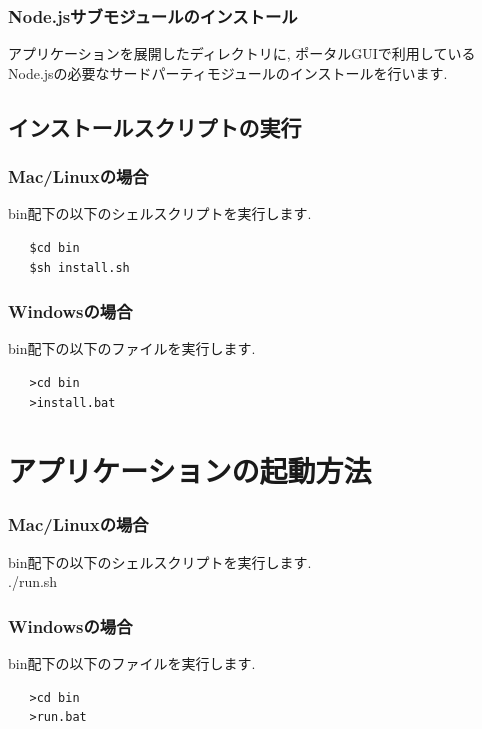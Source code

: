\documentclass[a4paper,10pt,oneside]{jsbook}
\begin{document}
\newpage


\subsection{Node.jsサブモジュールのインストール}
アプリケーションを展開したディレクトリに,
ポータルGUIで利用しているNode.jsの必要なサードパーティモジュールのインストールを行います.

\section{インストールスクリプトの実行}

\subsection{Mac/Linuxの場合}
bin配下の以下のシェルスクリプトを実行します.\\

\begin{verbatim}
   $cd bin
   $sh install.sh
\end{verbatim}


\subsection{Windowsの場合}
bin配下の以下のファイルを実行します.\\
\begin{verbatim}
   >cd bin
   >install.bat
\end{verbatim}

\newpage


\chapter{アプリケーションの起動方法}


\subsection{Mac/Linuxの場合}
bin配下の以下のシェルスクリプトを実行します.\\
./run.sh

\subsection{Windowsの場合}
bin配下の以下のファイルを実行します.\\
\begin{verbatim}
   >cd bin
   >run.bat
\end{verbatim}
\end{document}
